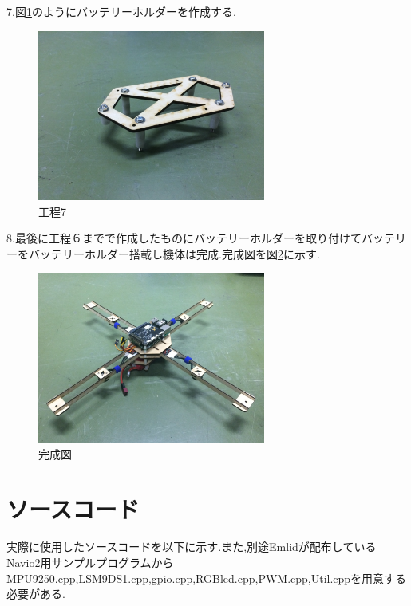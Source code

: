\documentclass[12pt,oneside]{sotsuken_paper}
\begin{document}
7.図\ref{fig:kitai5}のようにバッテリーホルダーを作成する.

\begin{figure}[htbp]
	\begin{center}
		\includegraphics[width=75mm]{image/kitai/kitai5.jpg}
		\caption{工程7}
		\label{fig:kitai5}
	\end{center}
\end{figure}

\newpage

8.最後に工程６までで作成したものにバッテリーホルダーを取り付けてバッテリーをバッテリーホルダー搭載し機体は完成.完成図を図\ref{fig:kitai}に示す.

\begin{figure}[htbp]
	\begin{center}
		\includegraphics[width=75mm]{image/kitai/kitai.jpg}
		\caption{完成図}
		\label{fig:kitai}
	\end{center}
\end{figure}

\clearpage

\section{ソースコード}
実際に使用したソースコードを以下に示す.また,別途Emlidが配布しているNavio2用サンプルプログラムからMPU9250.cpp,LSM9DS1.cpp,gpio.cpp,RGBled.cpp,PWM.cpp,Util.cppを用意する必要がある.


\end{document}
